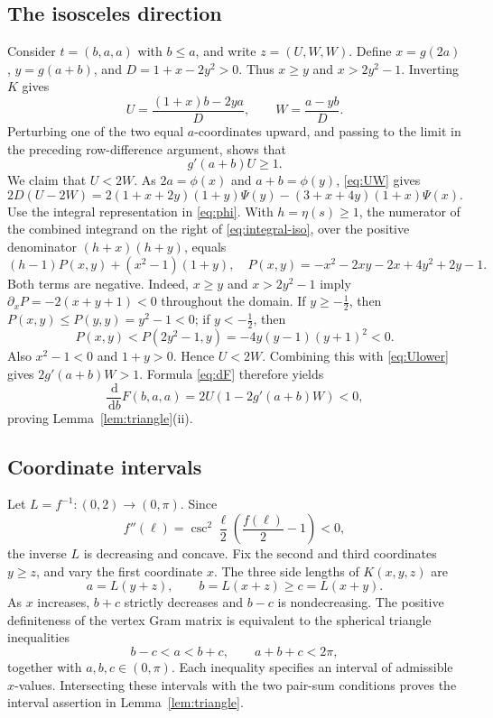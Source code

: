 \documentclass[11pt,reqno]{amsart}
\theoremstyle{remark}
\newcommand{\dd}{\,\mathrm d}
\begin{document}
\subsection{The isosceles direction}
Consider $t=(b,a,a)$ with $b\le a$, and write $z=(U,W,W)$. Define $x=g(2a)$, $y=g(a+b)$, and $D=1+x-2y^2>0$. Thus $x\ge y$ and $x>2y^2-1$. Inverting $K$ gives
\begin{equation}\label{eq:UW}
 U=\frac{(1+x)b-2ya}{D},\qquad
 W=\frac{a-yb}{D}.
\end{equation}
Perturbing one of the two equal $a$-coordinates upward, and passing to the limit in the preceding row-difference argument, shows that
\begin{equation}\label{eq:Ulower}
 g'(a+b)U\ge1.
\end{equation}
We claim that $U<2W$. As $2a=\phi(x)$ and $a+b=\phi(y)$, \eqref{eq:UW} gives
\begin{equation}\label{eq:integral-iso}
 2D(U-2W)=2(1+x+2y)(1+y)\Psi(y)
 -(3+x+4y)(1+x)\Psi(x).
\end{equation}
Use the integral representation in \eqref{eq:phi}. With $h=\eta(s)\ge1$, the numerator of the combined integrand on the right of \eqref{eq:integral-iso}, over the positive denominator $(h+x)(h+y)$, equals
\begin{equation}\label{eq:P}
 (h-1)P(x,y)+(x^2-1)(1+y),
 \quad P(x,y)=-x^2-2xy-2x+4y^2+2y-1.
\end{equation}
Both terms are negative. Indeed, $x\ge y$ and $x>2y^2-1$ imply $\partial_xP=-2(x+y+1)<0$ throughout the domain. If $y\ge-\tfrac12$, then
$P(x,y)\le P(y,y)=y^2-1<0$; if $y<-\tfrac12$, then
\[
 P(x,y)<P(2y^2-1,y)=-4y(y-1)(y+1)^2<0.
\]
Also $x^2-1<0$ and $1+y>0$. Hence $U<2W$. Combining this with \eqref{eq:Ulower} gives $2g'(a+b)W>1$. Formula \eqref{eq:dF} therefore yields
\[
 \frac{\dd}{\dd b}F(b,a,a)=2U(1-2g'(a+b)W)<0,
\]
proving Lemma~\ref{lem:triangle}(ii).

\subsection{Coordinate intervals}
Let $L=f^{-1}:(0,2)\to(0,\pi)$. Since
\[
 f''(\ell)=\csc^2\frac\ell2\left(\frac{f(\ell)}2-1\right)<0,
\]
the inverse $L$ is decreasing and concave. Fix the second and third coordinates $y\ge z$, and vary the first coordinate $x$. The three side lengths of $K(x,y,z)$ are
\[
 a=L(y+z),\qquad b=L(x+z)\ge c=L(x+y).
\]
As $x$ increases, $b+c$ strictly decreases and $b-c$ is nondecreasing. The positive definiteness of the vertex Gram matrix is equivalent to the spherical triangle inequalities
\begin{equation}\label{eq:triangle-domain}
 b-c<a<b+c,\qquad a+b+c<2\pi,
\end{equation}
together with $a,b,c\in(0,\pi)$. Each inequality specifies an interval of admissible $x$-values. Intersecting these intervals with the two pair-sum conditions proves the interval assertion in Lemma~\ref{lem:triangle}.
\end{document}
